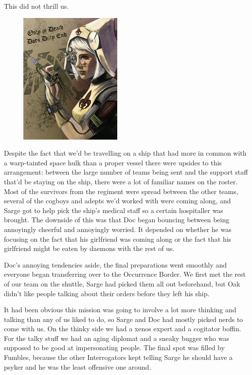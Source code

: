 This did not thrill us.

\begin{figure}
	\begin{center}
		\includegraphics[width=\figwidth]{pics/10/4.png}
	\end{center}
\end{figure}
Despite the fact that we'd be travelling on a ship that had more in common with a warp-tainted space hulk than a proper vessel there were upsides to this arrangement: 
between the large number of teams being sent and the support staff that'd be staying on the ship, there were a lot of familiar names on the roster. 
Most of the survivors from the regiment were spread between the other teams, several of the cogboys and adepts we'd worked with were coming along, and Sarge got to help pick the ship's medical staff so a certain hospitaller was brought. 
The downside of this was that Doc began bouncing between being annoyingly cheerful and annoyingly worried. 
It depended on whether he was focusing on the fact that his girlfriend was coming along or the fact that his girlfriend might be eaten by daemons with the rest of us.

Doc's annoying tendencies aside, the final preparations went smoothly and everyone began transferring over to the Occurrence Border. 
We first met the rest of our team on the shuttle, Sarge had picked them all out beforehand, but Oak didn't like people talking about their orders before they left his ship. 


It had been obvious this mission was going to involve a lot more thinking and talking than any of us liked to do, so Sarge and Doc had mostly picked nerds to come with us. 
On the thinky side we had a xenos expert and a cogitator boffin. 
For the talky stuff we had an aging diplomat and a sneaky bugger who was supposed to be good at impersonating people. 
The final spot was filled by Fumbles, because the other Interrogators kept telling Sarge he should have a psyker and he was the least offensive one around.


